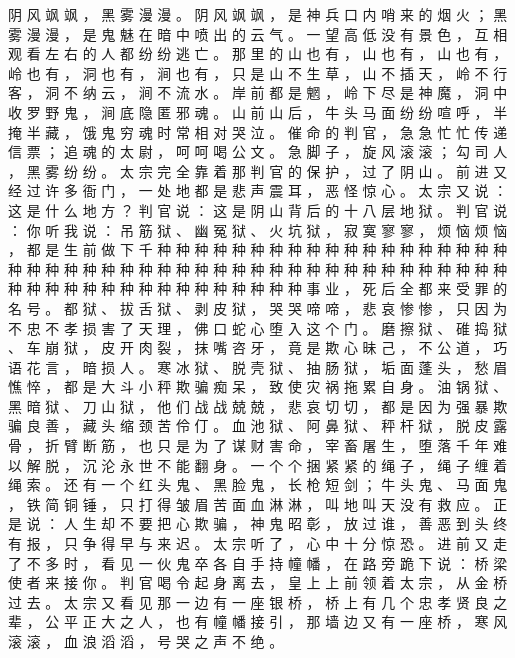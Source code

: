 {阴 风 飒 飒 ， 黑 雾 漫 漫 。
阴 风 飒 飒 ， 是 神 兵 口 内 哨 来 的 烟 火 ； 黑 雾 漫 漫 ， 是 鬼 魅 在 暗 中 喷 出 的 云 气 。
一 望 高 低 没 有 景 色 ， 互 相 观 看 左 右 的 人 都 纷 纷 逃 亡 。
那 里 的 山 也 有 ， 山 也 有 ， 山 也 有 ， 岭 也 有 ， 洞 也 有 ， 涧 也 有 ， 只 是 山 不 生 草 ， 山 不 插 天 ， 岭 不 行 客 ， 洞 不 纳 云 ， 涧 不 流 水 。
岸 前 都 是 魍 ， 岭 下 尽 是 神 魔 ， 洞 中 收 罗 野 鬼 ， 涧 底 隐 匿 邪 魂 。
山 前 山 后 ， 牛 头 马 面 纷 纷 喧 呼 ， 半 掩 半 藏 ， 饿 鬼 穷 魂 时 常 相 对 哭 泣 。
催 命 的 判 官 ， 急 急 忙 忙 传 递 信 票 ； 追 魂 的 太 尉 ， 呵 呵 喝 公 文 。
急 脚 子 ， 旋 风 滚 滚 ； 勾 司 人 ， 黑 雾 纷 纷 。
太 宗 完 全 靠 着 那 判 官 的 保 护 ， 过 了 阴 山 。
前 进 又 经 过 许 多 衙 门 ， 一 处 地 都 是 悲 声 震 耳 ， 恶 怪 惊 心 。
太 宗 又 说 ： 这 是 什 么 地 方 ？ 判 官 说 ： 这 是 阴 山 背 后 的 十 八 层 地 狱 。
判 官 说 ： 你 听 我 说 ： 吊 筋 狱 、 幽 冤 狱 、 火 坑 狱 ， 寂 寞 寥 寥 ， 烦 恼 烦 恼 ， 都 是 生 前 做 下 千 种 种 种 种 种 种 种 种 种 种 种 种 种 种 种 种 种 种 种 种 种 种 种 种 种 种 种 种 种 种 种 种 种 种 种 种 种 种 种 种 种 种 种 种 种 种 种 种 种 种 种 种 种 种 种 种 种 种 种 种 种 种 事 业 ， 死 后 全 都 来 受 罪 的 名 号 。
都 狱 、 拔 舌 狱 、 剥 皮 狱 ， 哭 哭 啼 啼 ， 悲 哀 惨 惨 ， 只 因 为 不 忠 不 孝 损 害 了 天 理 ， 佛 口 蛇 心 堕 入 这 个 门 。
磨 擦 狱 、 碓 捣 狱 、 车 崩 狱 ， 皮 开 肉 裂 ， 抹 嘴 咨 牙 ， 竟 是 欺 心 昧 己 ， 不 公 道 ， 巧 语 花 言 ， 暗 损 人 。
寒 冰 狱 、 脱 壳 狱 、 抽 肠 狱 ， 垢 面 蓬 头 ， 愁 眉 憔 悴 ， 都 是 大 斗 小 秤 欺 骗 痴 呆 ， 致 使 灾 祸 拖 累 自 身 。
油 锅 狱 、 黑 暗 狱 、 刀 山 狱 ， 他 们 战 战 兢 兢 ， 悲 哀 切 切 ， 都 是 因 为 强 暴 欺 骗 良 善 ， 藏 头 缩 颈 苦 伶 仃 。
血 池 狱 、 阿 鼻 狱 、 秤 杆 狱 ， 脱 皮 露 骨 ， 折 臂 断 筋 ， 也 只 是 为 了 谋 财 害 命 ， 宰 畜 屠 生 ， 堕 落 千 年 难 以 解 脱 ， 沉 沦 永 世 不 能 翻 身 。
一 个 个 捆 紧 紧 的 绳 子 ， 绳 子 缠 着 绳 索 。
还 有 一 个 红 头 鬼 、 黑 脸 鬼 ， 长 枪 短 剑 ； 牛 头 鬼 、 马 面 鬼 ， 铁 简 铜 锤 ， 只 打 得 皱 眉 苦 面 血 淋 淋 ， 叫 地 叫 天 没 有 救 应 。
正 是 说 ： 人 生 却 不 要 把 心 欺 骗 ， 神 鬼 昭 彰 ， 放 过 谁 ， 善 恶 到 头 终 有 报 ， 只 争 得 早 与 来 迟 。
太 宗 听 了 ， 心 中 十 分 惊 恐 。
进 前 又 走 了 不 多 时 ， 看 见 一 伙 鬼 卒 各 自 手 持 幢 幡 ， 在 路 旁 跪 下 说 ： 桥 梁 使 者 来 接 你 。
判 官 喝 令 起 身 离 去 ， 皇 上 上 前 领 着 太 宗 ， 从 金 桥 过 去 。
太 宗 又 看 见 那 一 边 有 一 座 银 桥 ， 桥 上 有 几 个 忠 孝 贤 良 之 辈 ， 公 平 正 大 之 人 ， 也 有 幢 幡 接 引 ， 那 墙 边 又 有 一 座 桥 ， 寒 风 滚 滚 ， 血 浪 滔 滔 ， 号 哭 之 声 不 绝 。
}
